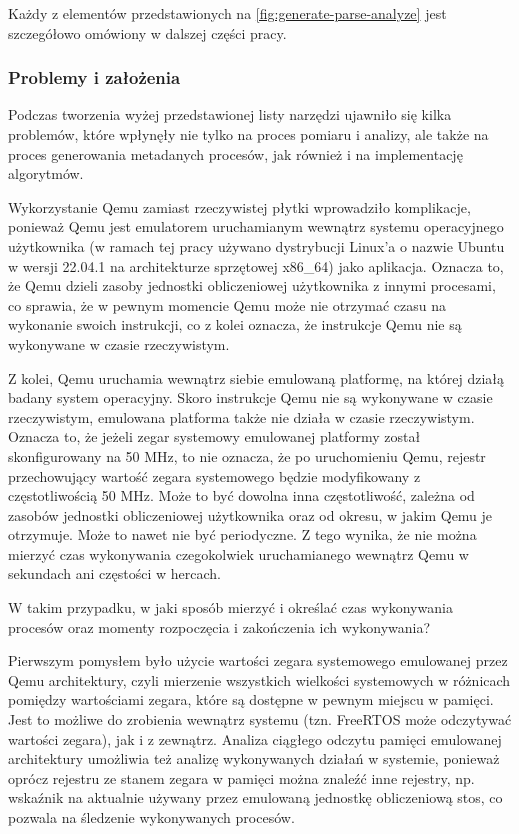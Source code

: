 \documentclass[../../main]{subfiles}
\begin{document}
Każdy z elementów przedstawionych na \cref{fig:generate-parse-analyze} jest szczegółowo omówiony w dalszej części pracy.

\subsubsection{Problemy i założenia}

Podczas tworzenia wyżej przedstawionej listy narzędzi ujawniło się kilka problemów, które wpłynęły nie tylko na proces pomiaru i analizy, ale także na proces generowania metadanych procesów, jak również i na implementację algorytmów.

Wykorzystanie Qemu zamiast rzeczywistej płytki wprowadziło komplikacje, ponieważ Qemu jest emulatorem uruchamianym wewnątrz systemu operacyjnego użytkownika (w ramach tej pracy używano dystrybucji Linux'a o nazwie Ubuntu w wersji 22.04.1 na architekturze sprzętowej x86\_64) jako aplikacja. Oznacza to, że Qemu dzieli zasoby jednostki obliczeniowej użytkownika z innymi procesami, co sprawia, że w pewnym momencie Qemu może nie otrzymać czasu na wykonanie swoich instrukcji, co z kolei oznacza, że instrukcje Qemu nie są wykonywane w czasie rzeczywistym.

Z kolei, Qemu uruchamia wewnątrz siebie emulowaną platformę, na której działą badany system operacyjny. Skoro instrukcje Qemu nie są wykonywane w czasie rzeczywistym, emulowana platforma także nie działa w czasie rzeczywistym. Oznacza to, że jeżeli zegar systemowy emulowanej platformy został skonfigurowany na 50 MHz, to nie oznacza, że po uruchomieniu Qemu, rejestr przechowujący wartość zegara systemowego będzie modyfikowany z częstotliwością 50 MHz. Może to być dowolna inna częstotliwość, zależna od zasobów jednostki obliczeniowej użytkownika oraz od okresu, w jakim Qemu je otrzymuje. Może to nawet nie być periodyczne. Z tego wynika, że nie można mierzyć czas wykonywania czegokolwiek uruchamianego wewnątrz Qemu w sekundach ani częstości w hercach.

W takim przypadku, w jaki sposób mierzyć i określać czas wykonywania procesów oraz momenty rozpoczęcia i zakończenia ich wykonywania?

Pierwszym pomysłem było użycie wartości zegara systemowego emulowanej przez Qemu architektury, czyli mierzenie wszystkich wielkości systemowych w różnicach pomiędzy wartościami zegara, które są dostępne w pewnym miejscu w pamięci. Jest to możliwe do zrobienia wewnątrz systemu (tzn. FreeRTOS może odczytywać wartości zegara), jak i z zewnątrz. Analiza ciągłego odczytu pamięci emulowanej architektury umożliwia też analizę wykonywanych działań w systemie, ponieważ oprócz rejestru ze stanem zegara w pamięci można znaleźć inne rejestry, np. wskaźnik na aktualnie używany przez emulowaną jednostkę obliczeniową stos, co pozwala na śledzenie wykonywanych procesów.
\end{document}
